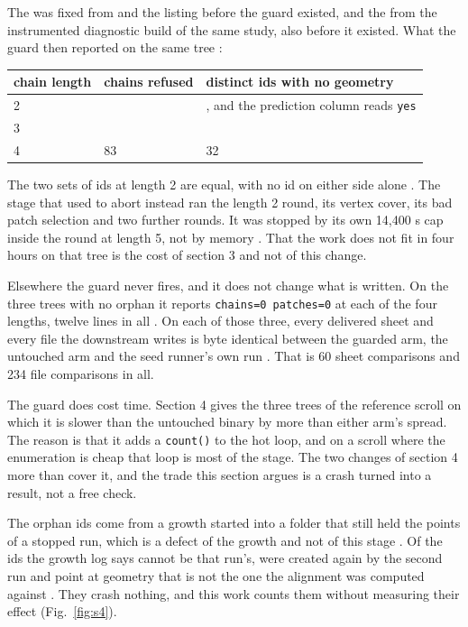 The \RefusedPatchesTwo{} was fixed from \protect{} and the \protect{} listing before the guard existed, and the \RefusedChainsTwo{} from the instrumented diagnostic build of the same study, also before it existed. What the guard then reported on the same tree {}:

\begin{table}[t]
\centering
\small
\begin{tabularx}{\textwidth}{XXX}
\toprule
chain length & chains refused & distinct ids with no geometry \\
\midrule
2 & \RefusedChainsTwo{} & \RefusedPatchesTwo{}, and the prediction column reads \texttt{yes} \\
3 & \RefusedChainsThree{} & \RefusedPatchesThree{} \\
4 & 83 & 32 \\
\bottomrule
\end{tabularx}
\end{table}

The two sets of ids at length 2 are equal, with no id on either side alone {}. The stage that used to abort instead ran the length 2 round, its vertex cover, its bad patch selection and two further rounds. It was stopped by its own 14,400 s cap inside the round at length 5, not by memory {}. That the work does not fit in four hours on that tree is the cost of section 3 and not of this change.

Elsewhere the guard never fires, and it does not change what is written. On the three trees with no orphan it reports \texttt{chains=0 patches=0} at each of the four lengths, twelve lines in all {}. On each of those three, every delivered sheet and every file the downstream writes is byte identical between the guarded arm, the untouched arm and the seed runner's own run {}. That is 60 sheet comparisons and 234 file comparisons in all.

The guard does cost time. Section 4 gives the three trees of the reference scroll on which it is slower than the untouched binary by more than either arm's spread. The reason is that it adds a \texttt{count(\allowbreak{})} to the hot loop, and on a scroll where the enumeration is cheap that loop is most of the stage. The two changes of section 4 more than cover it, and the trade this section argues is a crash turned into a result, not a free check.

The orphan ids come from a growth started into a folder that still held the points of a stopped run, which is a defect of the growth and not of this stage {}. Of the \MixedImpossibleIds{} ids the growth log says cannot be that run's, \MixedImpossibleWithFile{} were created again by the second run and point at geometry that is not the one the alignment was computed against {}. They crash nothing, and this work counts them without measuring their effect (Fig.~\ref{fig:s4}).

